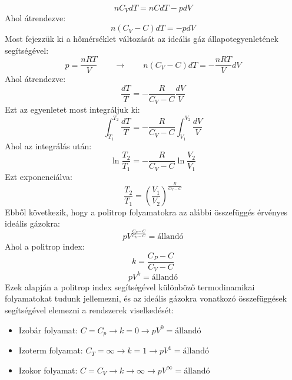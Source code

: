 \documentclass[a4paper,12pt]{article}
\begin{document}
\begin{equation}
    n C_V dT = n C dT - p dV
\end{equation}
Ahol átrendezve:
\begin{equation}
    n (C_V - C) dT = - p dV
\end{equation}
Most fejezzük ki a hőmérséklet változását az ideális gáz állapotegyenletének segítségével:
\begin{equation}
    p = \frac{nR T}{V} \qquad \to \qquad
    n (C_V - C) dT = - \frac{nR T}{V} dV
\end{equation}
Ahol átrendezve:
\begin{equation}
    \frac{dT}{T} = - \frac{R}{C_V - C} \frac{dV}{V}
\end{equation}
Ezt az egyenletet most integráljuk ki:
\begin{equation}
    \int_{T_1}^{T_2} \frac{dT}{T} = - \frac{R}{C_V - C} \int_{V_1}^{V_2} \frac{dV}{V}
\end{equation}
Ahol az integrálás után:
\begin{equation}
    \ln{\frac{T_2}{T_1}} = - \frac{R}{C_V - C} \ln{\frac{V_2}{V_1}}
\end{equation}
Ezt exponenciálva:
\begin{equation}
    \frac{T_2}{T_1} = \left(\frac{V_1}{V_2}\right)^{\frac{R}{C_V - C}}
\end{equation}
Ebből következik, hogy a politrop folyamatokra az alábbi összefüggés érvényes ideális gázokra:
\begin{equation}
    p V^{\frac{C_P - C}{C_V - C}} = \text{állandó}
\end{equation}
Ahol a politrop index:
\begin{equation}
    k = \frac{C_P - C}{C_V - C}
\end{equation}
\begin{equation}
    \boxed{p V^{k} = \text{állandó}}
\end{equation}
Ezek alapján a politrop index segítségével különböző termodinamikai folyamatokat tudunk jellemezni, és az ideális gázokra vonatkozó összefüggések segítségével elemezni a rendszerek viselkedését:
\begin{itemize}
    \item Izobár folyamat: $C = C_p \to k = 0 \to pV^0 = \text{állandó}$
    \item Izoterm folyamat: $C_T = \infty \to k = 1 \to pV^1 = \text{állandó}$
    \item Izokor folyamat: $C = C_V \to k \to \infty \to pV^{\infty} = \text{állandó}$
\end{itemize}
\end{document}
